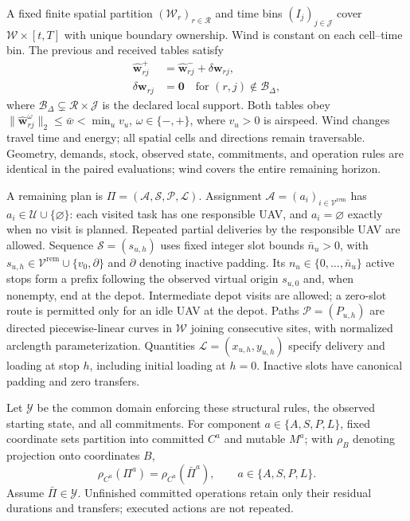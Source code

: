 A fixed finite spatial partition $(\mathcal W_r)_{r\in\mathcal R}$ and
time bins $(I_j)_{j\in\mathcal J}$ cover $\mathcal W\times[t,T]$ with unique
boundary ownership. Wind is constant on each cell--time bin.
The previous and received tables satisfy
\begin{equation}
\begin{split}
\widehat{\mathbf w}_{rj}^{+}
&=\widehat{\mathbf w}_{rj}^{-}+\delta\mathbf w_{rj},\\
\delta\mathbf w_{rj}&=\mathbf0\quad
\text{for }(r,j)\notin\mathcal B_\Delta,
\end{split}
\label{eq:local_wind_update}
\end{equation}
where $\mathcal B_\Delta\subsetneq\mathcal R\times\mathcal J$ is the
declared local support. Both tables obey
$\|\widehat{\mathbf w}_{rj}^{\omega}\|_2\le\bar w<\min_u v_u$,
$\omega\in\{-,+\}$, where $v_u>0$ is airspeed.
Wind changes travel time and energy; all spatial cells and directions
remain traversable.
Geometry, demands, stock, observed state, commitments, and operation rules
are identical in the paired evaluations; wind covers the entire remaining
horizon.

A remaining plan is $\Pi=(\mathcal A,\mathcal S,\mathcal P,\mathcal L)$.
Assignment $\mathcal A=(a_i)_{i\in\mathcal V^{\mathrm{rem}}}$ has
$a_i\in\mathcal U\cup\{\varnothing\}$: each visited task has one responsible
UAV, and $a_i=\varnothing$ exactly when no visit is planned. Repeated partial
deliveries by the responsible UAV are allowed.
Sequence $\mathcal S=(s_{u,h})$ uses fixed integer slot bounds $\bar n_u>0$,
with $s_{u,h}\in\mathcal V^{\mathrm{rem}}\cup\{v_0,\partial\}$ and
$\partial$ denoting inactive padding.
Its $n_u\in\{0,\ldots,\bar n_u\}$ active stops form a prefix following the
observed virtual origin $s_{u,0}$ and, when nonempty, end at the depot.
Intermediate depot visits
are allowed; a zero-slot route is permitted only for an idle UAV at the depot.
Paths $\mathcal P=(P_{u,h})$ are directed piecewise-linear curves in
$\mathcal W$ joining consecutive sites, with normalized arclength
parameterization. Quantities $\mathcal L=(x_{u,h},y_{u,h})$ specify
delivery and loading at stop $h$, including initial loading at $h=0$.
Inactive slots have canonical padding and zero transfers.

Let $\mathcal Y$ be the common domain enforcing these structural rules,
the observed starting state, and all commitments. For component
$a\in\{A,S,P,L\}$, fixed coordinate sets partition into committed $C^a$
and mutable $M^a$; with $\rho_B$ denoting projection onto coordinates $B$,
\begin{equation}
\rho_{C^a}(\Pi^a)=\rho_{C^a}(\bar\Pi^a),\qquad a\in\{A,S,P,L\}.
\label{eq:commitment_projection}
\end{equation}
Assume $\bar\Pi\in\mathcal Y$. Unfinished committed operations retain only
their residual durations and transfers; executed actions are not repeated.

